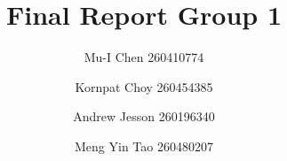 \documentclass[conference]{IEEEtran}
\begin{document}
%
\title{Final Report Group 1}



\author{Mu-I Chen 260410774  \and Kornpat Choy 260454385 \and Andrew Jesson 260196340 \and Meng Yin Tao 260480207}


% 
\end{document}
